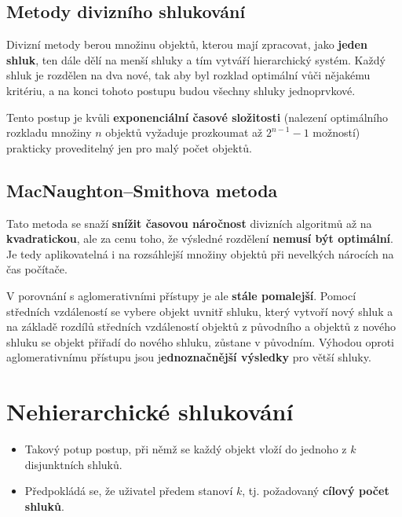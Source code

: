 \subsection{Metody divizního shlukování}
Divizní metody berou množinu objektů, kterou mají zpracovat, jako \textbf{jeden shluk}, ten dále dělí na menší shluky a tím vytváří hierarchický systém. Každý shluk je rozdělen na dva nové, tak aby byl rozklad optimální vůči nějakému kritériu, a na konci tohoto postupu budou všechny shluky jednoprvkové.

Tento postup je kvůli \textbf{exponenciální časové složitosti} (nalezení optimálního rozkladu množiny $n$ objektů vyžaduje prozkoumat až $2^{n-1}-1$ možností) prakticky proveditelný jen pro malý počet objektů.

\subsection*{MacNaughton–Smithova metoda}
Tato metoda se snaží \textbf{snížit časovou náročnost} divizních algoritmů až na \textbf{kvadratickou}, ale za cenu toho, že výsledné rozdělení \textbf{nemusí být optimální}. Je tedy aplikovatelná i na rozsáhlejší množiny objektů při nevelkých nárocích na čas počítače.

V porovnání s aglomerativními přístupy je ale \textbf{stále pomalejší}. Pomocí středních vzdáleností se vybere objekt uvnitř shluku, který vytvoří nový shluk a na základě rozdílů středních vzdáleností objektů z původního a objektů z nového shluku se objekt přiřadí do nového shluku, zůstane v původním. Výhodou oproti aglomerativnímu přístupu jsou j\textbf{ednoznačnější výsledky} pro větší shluky.

\section{Nehierarchické shlukování}
\begin{itemize}
    \item Takový potup postup, při němž se každý objekt vloží do jednoho z $ k $ disjunktních shluků.
    \item Předpokládá se, že uživatel předem stanoví $ k $, tj. požadovaný \textbf{cílový počet shluků}.
\end{itemize}

